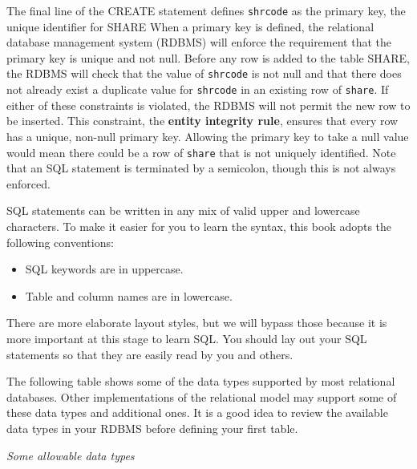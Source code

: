 \documentclass[
]{article}
\begin{document}
The final line of the CREATE statement defines \texttt{shrcode} as the primary key, the unique identifier for SHARE When a primary key is defined, the relational database management system (RDBMS) will enforce the requirement that the primary key is unique and not null. Before any row is added to the table SHARE, the RDBMS will check that the value of \texttt{shrcode} is not null and that there does not already exist a duplicate value for \texttt{shrcode} in an existing row of \texttt{share}. If either of these constraints is violated, the RDBMS will not permit the new row to be inserted. This constraint, the \textbf{entity integrity rule}, ensures that every row has a unique, non-null primary key. Allowing the primary key to take a null value would mean there could be a row of \texttt{share} that is not uniquely identified. Note that an SQL statement is terminated by a semicolon, though this is not always enforced.

SQL statements can be written in any mix of valid upper and lowercase characters. To make it easier for you to learn the syntax, this book adopts the following conventions:

\begin{itemize}
\item
  SQL keywords are in uppercase.
\item
  Table and column names are in lowercase.
\end{itemize}

There are more elaborate layout styles, but we will bypass those because it is more important at this stage to learn SQL. You should lay out your SQL statements so that they are easily read by you and others.

The following table shows some of the data types supported by most relational databases. Other implementations of the relational model may support some of these data types and additional ones. It is a good idea to review the available data types in your RDBMS before defining your first table.

\emph{Some allowable data types}
\end{document}
